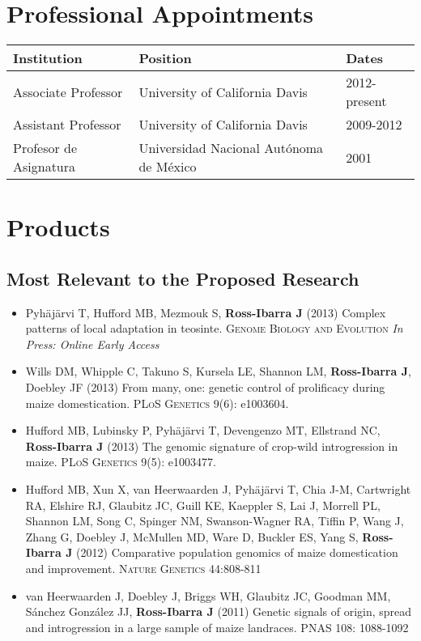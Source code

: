 \documentclass[11pt]{article}
\begin{document}
\section{Professional Appointments}

\begin{tabular}{l l l}
Institution                              & Position                 & Dates\\
\hline
Associate Professor & University of California Davis &		2012-present \\
Assistant Professor & University of California Davis &		2009-2012 \\
Profesor de Asignatura & Universidad Nacional Aut\'{o}noma de M\'{e}xico & 2001 \\
\hline
\end{tabular}

\section{Products}

\subsection*{Most Relevant to the Proposed Research}

\begin{itemize} \setlength{\itemsep}{0pt} \setlength{\parskip}{2pt} \setlength{\parsep}{0pt}

\item Pyh\"aj\"arvi T, Hufford MB, Mezmouk S, {\bf Ross-Ibarra J} (2013) Complex patterns of local adaptation in teosinte. \textsc{Genome Biology and Evolution} \emph{In Press: Online Early Access}

\item Wills DM, Whipple C, Takuno S, Kursela LE, Shannon LM, {\bf Ross-Ibarra J}, Doebley JF (2013) From many, one: genetic control of prolificacy during maize domestication. \textsc{PLoS Genetics} 9(6): e1003604. %

\item Hufford MB, Lubinsky P, Pyh\"aj\"arvi T, Devengenzo MT, Ellstrand NC, {\bf Ross-Ibarra J} (2013) The genomic signature of crop-wild introgression in maize. \textsc{PLoS Genetics} 9(5): e1003477. %

\item Hufford MB, Xun X, van Heerwaarden J, Pyh\"aj\"arvi T, Chia J-M, Cartwright RA, Elshire RJ, Glaubitz JC, Guill KE, Kaeppler S, Lai J, Morrell PL, Shannon LM, Song C, Spinger NM, Swanson-Wagner RA, Tiffin P, Wang J, Zhang G, Doebley J, McMullen MD, Ware D, Buckler ES, Yang S, {\bf Ross-Ibarra J} (2012) Comparative population genomics of maize domestication and improvement. \textsc{Nature Genetics} 44:808-811

\item van Heerwaarden J, Doebley J, Briggs WH, Glaubitz JC, Goodman MM, S\'{a}nchez Gonz\'{a}lez JJ, {\bf Ross-Ibarra J} (2011) Genetic signals of origin, spread and introgression in a large sample of maize landraces. PNAS 108: 1088-1092

\end{itemize}
\end{document}
